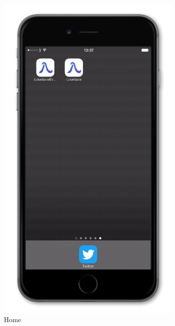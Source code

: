 \documentclass{article}
\begin{document}
\begin{figure}[H]
    \vspace{-8em}
    \centering
    \begin{subfigure}[b]{0.48\textwidth}
        \includegraphics[width=\textwidth]{iphone_1_home}
        \caption{Home}
    \end{subfigure}
    ~ 
    \begin{subfigure}[b]{0.48\textwidth}

\end{subfigure}
\end{figure}
\end{document}
